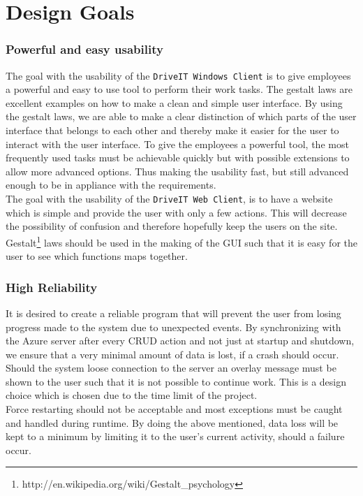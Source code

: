\section{Design Goals}
\subsubsection{Powerful and easy usability}
The goal with the usability of the \texttt{DriveIT Windows Client} is to give employees a powerful and easy to use tool to perform their work tasks. The gestalt laws are excellent examples on how to make a clean and simple user interface. By using the gestalt laws, we are able to make a clear distinction of which parts of the user interface that belongs to each other and thereby make it easier for the user to interact with the user interface. To give the employees a powerful tool, the most frequently used tasks must be achievable quickly but with possible extensions to allow more advanced options. Thus making the usability fast, but still advanced enough to be in appliance with the requirements.\\

The goal with the usability of the \texttt{DriveIT Web Client}, is to have a website which is simple and provide the user with only a few actions. This will decrease the possibility of confusion and therefore hopefully keep the users on the site. Gestalt\footnote{http://en.wikipedia.org/wiki/Gestalt_psychology} laws should be used in the making of the GUI such that it is easy for the user to see which functions maps together. \subsubsection{High Reliability} It is desired to create a reliable program that will prevent the user from losing progress made to the system due to unexpected events. By synchronizing with the Azure server after every CRUD action and not just at startup and shutdown, we ensure that a very minimal amount of data is lost, if a crash should occur. Should the system loose connection to the server an overlay message must be shown to the user such that it is not possible to continue work. This is a design choice which is chosen due to the time limit of the project. \\
Force restarting should not be acceptable and most exceptions must be caught and handled during runtime. By doing the above mentioned, data loss will be kept to a minimum by limiting it to the user's current activity, should a failure occur.

